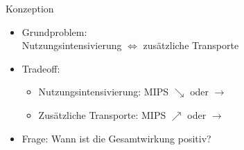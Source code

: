 \documentclass[beamer, xcolor={table,usenames,dvipsnames}]{beamer}
\begin{document}
    \begin{frame}{Konzeption}
    	\begin{itemize}
    		\item<1-> Grundproblem: \\ Nutzungsintensivierung $\Leftrightarrow$ zusätzliche Transporte
    		\item<2-> Tradeoff:
	    		\begin{itemize}
	    			\item Nutzungsintensivierung: MIPS $\searrow$ oder $\rightarrow$
	    			\item Zusätzliche Transporte: MIPS $\nearrow$ oder $\rightarrow$
	    		\end{itemize}
    		\item<3-> Frage: Wann ist die Gesamtwirkung positiv? \\[1em]
    	\end{itemize}
    \end{frame}
\end{document}
